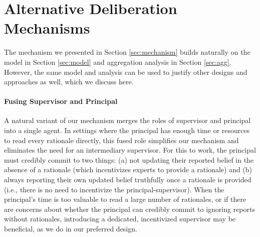 \documentclass{winnower}
\begin{document}
\section{Alternative Deliberation Mechanisms} \label{sec:alt}

The mechanism we presented in Section \ref{sec:mechanism} builds naturally on the model in Section \ref{sec:model} and aggregation analysis in Section \ref{sec:agg}. However, the same model and analysis can be used to justify other designs and approaches as well, which we discuss here.

\paragraph{Fusing Supervisor and Principal}

A natural variant of our mechanism merges the roles of supervisor and principal into a single agent. In settings where the principal has enough time or resources to read every rationale directly, this fused role simplifies our mechanism and eliminates the need for an intermediary supervisor. For this to work, the principal must credibly commit to two things: (a) not updating their reported belief in the absence of a rationale (which incentivizes experts to provide a rationale) and (b) always reporting their own updated belief truthfully once a rationale is provided (i.e., there is no need to incentivize the principal-supervisor). When the principal’s time is too valuable to read a large number of rationales, or if there are concerns about whether the principal can credibly commit to ignoring reports without rationales, introducing a dedicated, incentivized supervisor may be beneficial, as we do in our preferred design.

\end{document}
